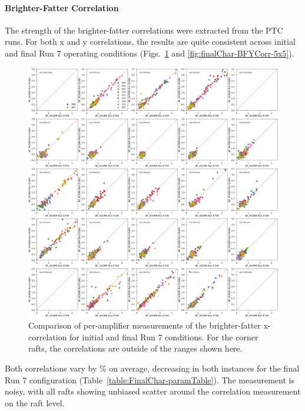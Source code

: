 \clearpage
\paragraph{Brighter-Fatter Correlation}\label{final-brighter-fatter-correlation}

The strength of the brighter-fatter correlations  were extracted from the PTC runs. For both x and y correlations, the results are quite consistent across initial and final Run 7 operating conditions (Figs.~\ref{fig:finalChar-BFXCorr-5x5} and \ref{fig:finalChar-BFYCorr-5x5}).

\begin{figure}[ht]
    \centering
    \includegraphics[width=0.7\linewidth]{figures/finalCharacterization/E749_E1881_BF_XCORR.png}
    \caption{Comparison of per-amplifier measurements of the brighter-fatter x-correlation for initial and final Run 7 conditions. For the corner rafts, the correlations are outside of the ranges shown here.}
    \label{fig:finalChar-BFXCorr-5x5}
\end{figure}

Both correlations vary by \% on average, decreasing in both instances for the final Run 7 configuration (Table~\ref{table:FinalChar-paramTable}). The measurement is noisy, with all rafts showing unbiased scatter around the correlation measurement on the raft level. %

